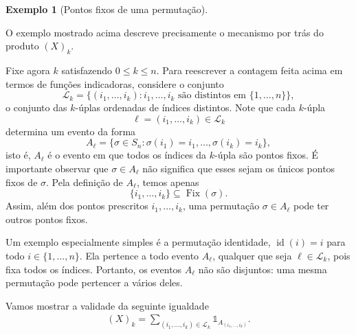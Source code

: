 \documentclass[12pt,portuguese]{article}
\theoremstyle{definition}
\newtheorem{example}[example]{Exemplo}
\theoremstyle{plainexercise}
\theoremstyle{starredexercise}
\theoremstyle{definition}
\begin{document}
\begin{example}[Pontos fixos de uma permutação]
\begin{center}
\end{center}
\noindent

O exemplo mostrado acima descreve 
precisamente o mecanismo por trás do produto $(X)_k$.


\bigskip 


Fixe agora $k$ satisfazendo $0\leqslant k\leqslant n$. 
Para reescrever a contagem feita acima em termos de funções indicadoras,
considere o conjunto 
\[
\mathcal{L}_k=\{(i_1,\ldots,i_k):i_1,\ldots,i_k
\text{ são distintos em }\{1,\ldots,n\}\},
\]
o conjunto das $k$-úplas ordenadas de índices distintos. 
Note que cada $k$-úpla
\[
\ell=(i_1,\ldots,i_k)\in\mathcal{L}_k
\]
determina um evento da forma
\[
A_{\ell}
=\{\sigma\in S_n:
\sigma(i_1)=i_1,\ldots,\sigma(i_k)=i_k\},
\]
isto é, $A_{\ell}$ é o evento em que todos os índices da $k$-úpla são pontos
fixos. É importante observar que $\sigma\in A_{\ell}$ não significa que
esses sejam os únicos pontos fixos de $\sigma$. Pela definição de $A_{\ell}$,
temos apenas
\[
\{i_1,\ldots,i_k\}\subseteq \operatorname{Fix}(\sigma).
\]
Assim, além dos pontos prescritos $i_1,\ldots,i_k$, uma permutação
$\sigma\in A_{\ell}$ pode ter outros pontos fixos.

Um exemplo especialmente simples é a permutação identidade,
$\operatorname{id}(i)=i$ para todo $i\in\{1,\ldots,n\}$. Ela pertence a
todo evento $A_{\ell}$, qualquer que seja $\ell\in\mathcal{L}_k$, pois fixa
todos os índices. Portanto, os eventos $A_{\ell}$ não são disjuntos: uma
mesma permutação pode pertencer a vários deles. 

Vamos mostrar a validade da seguinte igualdade
\begin{align}\label{eq-aux1-Xk-sum}
(X)_k
=\sum_{(i_1,\ldots,i_k)\in\mathcal{L}_k}
\mathds{1}_{A_{(i_1,\ldots,i_k)}}.
\end{align}


\end{example}
\end{document}
